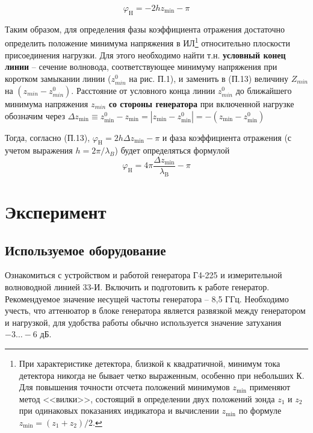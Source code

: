 \documentclass[a4paper,12pt]{article}
\begin{document}
\begin{equation}
	\varphi _ { \mathrm { H } } = - 2 h z _ { \mathrm { min } } - \pi
\end{equation}

Таким образом, для определения фазы коэффициента отражения достаточно определить положение минимума напряжения в ИЛ\footnote{При характеристике детектора, близкой к квадратичной, минимум тока детектора никогда не бывает четко выраженным, особенно при небольших К. Для повышения точности отсчета положений минимумов $z_{\min}$ применяют метод <<вилки>>, состоящий в определении двух положений зонда $z_1$ и $z_2$ при одинаковых показаниях индикатора и вычислении $z_{\min}$ по формуле $z_{\min}=(z_1+z_2)/2$.} относительно плоскости присоединения нагрузки. 
%
Для этого необходимо найти т.н. \textbf{условный конец линии} -- сечение волновода, соответствующее минимуму напряжения при коротком замыкании линии ($z^0_{min}$ на рис. П.1), и заменить в (П.13) величину $Z_{min}$ на $(z_{min}-z_{min}^0)$. 
Расстояние от условного конца линии $z^0_{min}$ до ближайшего минимума напряжения $z_{min}$ \textbf{со стороны генератора} при включенной нагрузке обозначим через 
$\Delta z _ { \min } \equiv z _ { \min } ^ { 0 } - z _ { \min } = \left| z _ { \min } - z _ { \min } ^ { 0 } \right| =- \left( z _ { \min } - z _ { \min } ^ { 0 } \right)$

Тогда, согласно (П.13),  $\varphi _ { \mathrm { H } } = 2 h \Delta z _ { \mathrm { min } } - \pi$ и фаза коэффициента отражения (с учетом выражения $h=2\pi/\lambda_B$) будет определяться формулой
\begin{equation}
	\varphi _ { \mathrm { H } } = 4 \pi \frac { \Delta z _ { \mathrm { min } } } { \lambda _ { \mathrm { B } } } - \pi
\end{equation}

\section{Эксперимент}

\subsection{Используемое оборудование}

Ознакомиться с устройством и работой генератора Г4-225 и измерительной волноводной линией 33-И. Включить и подготовить к работе генератор. Рекомендуемое значение несущей частоты генератора -- 8,5 ГГц. Необходимо учесть, что аттенюатор в блоке генератора является развязкой между генератором и нагрузкой, для удобства работы обычно используется значение затухания $-3\ldots-6$ дБ.
\end{document}
